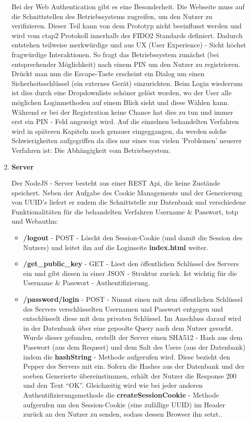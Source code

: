 \begin{enumerate}
Bei der Web Authentication gibt es eine Besonderheit. Die Webseite muss auf die Schnittstellen des Betriebssystems zugreifen, um den Nutzer zu verifizieren. Dieser Teil kann von dem Prototyp nicht beeinflusst werden und wird vom \ac{ctap}2 Protokoll innerhalb des FIDO2 Standards definiert. Dadurch entstehen teilweise merkwürdige und aus UX (User Experience) - Sicht höchst fragwürdige Interaktionen. So fragt das Betriebssystem zunächst (bei entsprechender Möglichkeit) nach einem PIN um den Nutzer zu registrieren. Drückt man nun die Escape-Taste erscheint ein Dialog um einen Sicherheitsschlüssel (ein externes Gerät) einzurichten. Beim Login wiederrum ist dies durch eine Dropdownliste schöner gelöst worden, wo der User alle möglichen Loginmethoden auf einem Blick sieht und diese Wählen kann. Während er bei der Registration keine Chance hat dies zu tun und immer erst ein PIN - Feld angezeigt wird. Auf die einzelnen behandelten Verfahren wird in späteren Kapiteln noch genauer eingeggangen, da werden solche Schwierigkeiten aufgegriffen da dies nur eines von vielen 'Problemen' neuerer Verfahren ist: Die Abhängigkeit vom Betriebssystem.

\item \textbf{Server}

Der NodeJS - Server besteht aus einer REST Api, die keine Zustände speichert. Neben der Aufgabe des Cookie Managements und der Generierung von UUID's liefert er zudem die Schnittstelle zur Datenbank und verschiedene Funktionalitäten für die behandelten Verfahren Username \& Passwort, \ac{totp} und Webauthn:

\begin{itemize}
 \item \textbf{/logout} - POST - Löscht den Session-Cookie (und damit die Session des Nutzers) und leitet ihn auf die Loginseite \textbf{index.html} weiter.

 \item \textbf{/get\_public\_key} - GET - Liest den öffentlichen Schlüssel des Servers ein und gibt diesen in einer JSON - Struktur zurück. Ist wichtig für die Username \& Passwort - Authentifizierung.

 \item \textbf{/password/login} - POST - Nimmt einen mit dem öffentlichen Schlüssel des Servers verschlüsselten Usernamen und Passwort entgegen und entschlüsselt diese mit dem privaten Schlüssel. Im Anschluss darauf wird in der Datenbank über eine gepoolte Query nach dem Nutzer gesucht. Wurde dieser gefunden, erstellt der Server einen SHA512 - Hash aus dem Passwort (aus dem Request) und dem Salt des Users (aus der Datenbank) indem die \textbf{hashString} - Methode aufgerufen wird. Diese bezieht den Pepper des Servers mit ein. Sofern die Hashes aus der Datenbank und der soeben Generierte übereinstimmen, erhält der Nutzer die Response 200 und den Text ``OK''. Gleichzeitig wird wie bei jeder anderen Authentifizierungsmethode die \textbf{createSessionCookie} - Methode aufgerufen um den Session-Cookie (eine zufällige UUID) im Header zurück an den Nutzer zu senden, sodass dessen Browser ihn setzt..
 \newpage
 

\end{itemize}
\end{enumerate}
